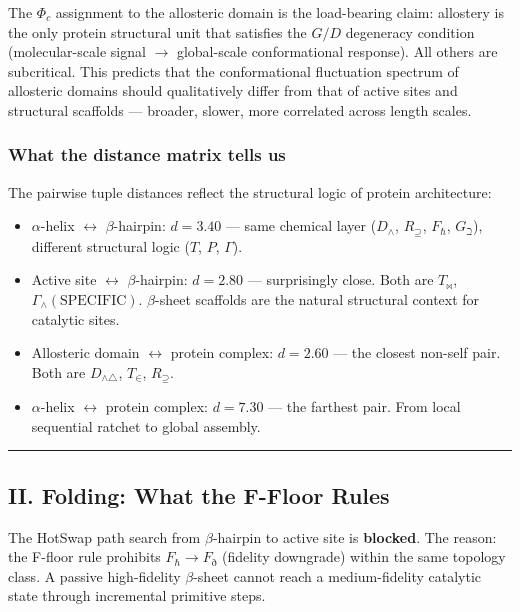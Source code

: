 \documentclass[10pt,a4paper]{article}
\begin{document}
The $\Phi_c$ assignment to the allosteric domain is the load-bearing claim: allostery is the only protein structural unit that satisfies the $G/D$ degeneracy condition (molecular-scale signal $\rightarrow$ global-scale conformational response). All others are subcritical. This predicts that the conformational fluctuation spectrum of allosteric domains should qualitatively differ from that of active sites and structural scaffolds --- broader, slower, more correlated across length scales.

\subsubsection{What the distance matrix tells us}

The pairwise tuple distances reflect the structural logic of protein architecture:

\begin{itemize}
    \item $\alpha$-helix $\leftrightarrow$ $\beta$-hairpin: $d = 3.40$ --- same chemical layer ($D_\wedge$, $R_\supseteq$, $F_\hbar$, $G_\beth$), different structural logic ($T$, $P$, $\Gamma$).
    \item Active site $\leftrightarrow$ $\beta$-hairpin: $d = 2.80$ --- surprisingly close. Both are $T_\bowtie$, $\Gamma_\wedge(\text{SPECIFIC})$. $\beta$-sheet scaffolds are the natural structural context for catalytic sites.
    \item Allosteric domain $\leftrightarrow$ protein complex: $d = 2.60$ --- the closest non-self pair. Both are $D_{\wedge\triangle}$, $T_\in$, $R_\supseteq$.
    \item $\alpha$-helix $\leftrightarrow$ protein complex: $d = 7.30$ --- the farthest pair. From local sequential ratchet to global assembly.
\end{itemize}

\begin{center}
\rule{0.5\textwidth}{0.4pt}
\end{center}

\subsection{II. Folding: What the F-Floor Rules}

The HotSwap path search from $\beta$-hairpin to active site is \textbf{blocked}. The reason: the F-floor rule prohibits $F_\hbar \to F_\eth$ (fidelity downgrade) within the same topology class. A passive high-fidelity $\beta$-sheet cannot reach a medium-fidelity catalytic state through incremental primitive steps.
\end{document}
